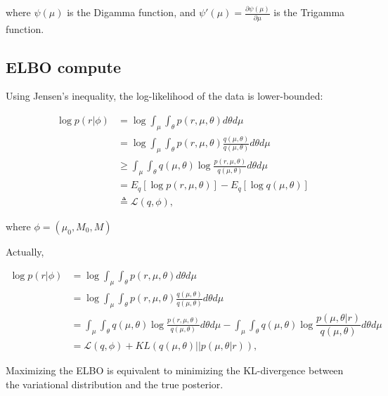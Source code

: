 \documentclass[11pt,reqno]{amsart}
\begin{document}
where $ \psi(\mu) $ is the Digamma function, and $ \psi'(\mu)= \frac{\partial \psi(\mu)}{\partial \mu}$ is the Trigamma function.
\subsection{ELBO compute}

Using Jensen's inequality, the log-likelihood of the data is lower-bounded:

\begin{equation}
\begin{split}
\log p \left( r | \phi \right) &= \log \int_\mu \int_\theta p\left(r,\mu,\theta \right) d\theta d\mu \\ 
&= \log \int_\mu \int_\theta p\left(r,\mu,\theta \right)\frac{q\left(\mu,\theta \right) }{q\left(\mu,\theta \right) } d\theta d\mu \\ 
&\geq \int_\mu \int_\theta q\left(\mu,\theta \right) \log \frac{ p\left(r,\mu,\theta \right)}{q\left(\mu,\theta \right)} d\theta d\mu \\
&= E_q \left[ \log p\left(r,\mu,\theta \right)\right] - E_q \left[ \log q\left(\mu,\theta \right)\right] \\
&\triangleq \mathcal{L}(q, \phi) ,
\end{split}
\end{equation}

where $ \phi= \left( \mu_0, M_0, M \right) $

Actually, 

\begin{equation}
\begin{split}
\log p \left( r | \phi \right) &= \log \int_\mu \int_\theta p\left(r,\mu,\theta \right) d\theta d\mu \\ 
&= \log \int_\mu \int_\theta p\left(r,\mu,\theta \right)\frac{q\left(\mu,\theta \right) }{q\left(\mu,\theta \right) } d\theta d\mu \\ 
&= \int_\mu \int_\theta q\left(\mu,\theta \right) \log \frac{ p\left(r,\mu,\theta \right)}{q\left(\mu,\theta \right)} d\theta d\mu - \int_\mu \int_\theta q\left(\mu,\theta \right) \log \dfrac{p\left( \mu, \theta | r\right) }{q\left(\mu,\theta \right)} d\theta d\mu \\
&= \mathcal{L}(q, \phi) + KL\left(q(\mu,\theta ) || p( \mu, \theta | r) \right) ,
\end{split}
\end{equation}

Maximizing the ELBO is equivalent to minimizing the KL-divergence between the variational distribution and the true posterior.
\end{document}
